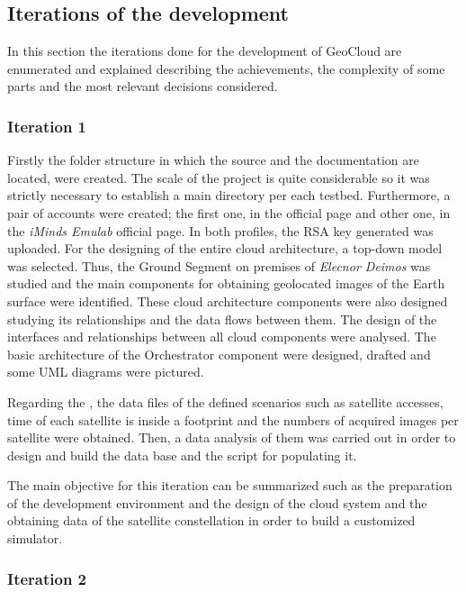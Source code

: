 \subsection{Iterations of the development}

In this section the iterations done for the development of GeoCloud are
enumerated and explained describing the achievements, the complexity of some
parts and the most relevant decisions considered.

\subsubsection{Iteration 1}

Firstly the folder structure in which the source and the documentation are
located, were created. The scale of the project is quite considerable so it was
strictly necessary to establish a main directory per each testbed. Furthermore,
a pair of accounts were created; the first one, in the \bonfire official page
and other one, in the \emph{iMinds Emulab} official page. In both profiles, the
\ac{RSA} key generated was uploaded.
For the designing of the entire cloud architecture, a top-down model was
selected. Thus, the Ground Segment on premises of \emph{Elecnor Deimos} was
studied and the main components for obtaining geolocated images of the Earth
surface were identified. These cloud architecture components were also designed
studying its relationships and the data flows between them. The design of the
interfaces and relationships between all cloud components were analysed. 
The basic architecture of the Orchestrator component were
designed, drafted and some \ac{UML} diagrams were pictured. 

Regarding the \sss, the data files of the defined scenarios such as satellite accesses,
time of each satellite is inside a footprint and the numbers of acquired images per
satellite were obtained. Then, a data analysis of them was carried out in order
to design and build the data base and the script for populating it.


The main objective for this iteration can be summarized such as the preparation
of the development environment and the design of the cloud system and the
obtaining data of the satellite constellation in order to build a customized simulator.

\subsubsection{Iteration 2}

